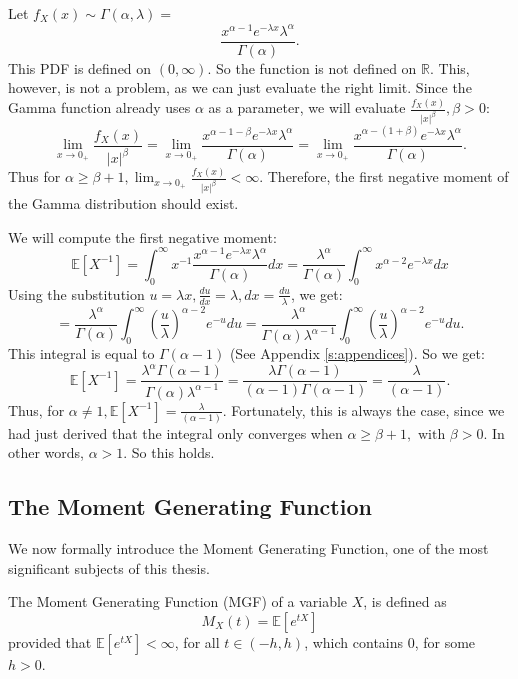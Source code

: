 \begin{example}\label{e: negative}
    Let \(f_X(x) \sim \Gamma(\alpha, \lambda) =\) 
    \[\frac{x^{\alpha -1} e^{-\lambda x} \lambda^\alpha} {\Gamma(\alpha)}.\] This PDF is defined on \((0, \infty)\). So the function is not defined on \(\mathbb{R}\). This, however, is not a problem, as we can just evaluate the right limit. Since the Gamma function already uses \(\alpha\) as a parameter, we will evaluate \(\frac{f_X(x)}{|x|^\beta}, \beta > 0\):
    \[\lim_{x \to 0_+} \frac{f_X(x)}{|x|^\beta} = \lim_{x \to 0_+} \frac{x^{\alpha -1 - \beta} e^{-\lambda x} \lambda^\alpha} {\Gamma(\alpha)} = \lim_{x \to 0_+} \frac{x^{\alpha -(1 + \beta)} e^{-\lambda x} \lambda^\alpha} {\Gamma(\alpha)} .\] Thus for \(\alpha \geq \beta + 1, \lim_{x \to 0_+} \frac{f_X(x)}{|x|^\beta} < \infty\). Therefore, the first negative moment of the Gamma distribution should exist.

    We will compute the first negative moment: 
    \[ \mathbb{E}[X^{-1}] = \int_{0}^{\infty} x^{-1} \frac{x^{\alpha -1} e^{-\lambda x} \lambda^\alpha} {\Gamma(\alpha)} dx = \frac{\lambda^\alpha}{\Gamma(\alpha)} \int_{0}^{\infty} x^{\alpha - 2} e^{-\lambda x} dx\]
    Using the substitution \( u = \lambda x, \frac{du}{dx} = \lambda, dx = \frac{du}{\lambda}\), we get:
    \[ = \frac{\lambda^\alpha}{\Gamma(\alpha)} \int_{0}^{\infty}\left(\frac{u}{\lambda}\right)^{\alpha -2} e^{-u} du = \frac{\lambda^\alpha}{\Gamma(\alpha) \lambda^{\alpha-1}} \int_{0}^{\infty}(\frac{u}{\lambda})^{\alpha -2} e^{-u} du.\] This integral is equal to \(\Gamma(\alpha - 1)\) (See Appendix \ref{s:appendices}). So we get: 
    \[\mathbb{E}[X^{-1}] = \frac{\lambda^\alpha \Gamma(\alpha - 1) }{\Gamma(\alpha) \lambda^{\alpha-1}} = \frac{\lambda \Gamma(\alpha - 1)}{(\alpha -1)\Gamma(\alpha - 1)} = \frac{\lambda}{(\alpha -1)}.\] Thus, for \(\alpha \neq 1, \mathbb{E}[X^{-1}] = \frac{\lambda}{(\alpha -1)}\). Fortunately, this is always the case, since we had just derived that the integral only converges when \(\alpha \geq \beta + 1, \text{ with } \beta > 0\). In other words, \(\alpha > 1\). So this holds.
\end{example}
\subsection{The Moment Generating Function}
We now formally introduce the Moment Generating Function, one of the most significant subjects of this thesis.
\begin{definition}
    The Moment Generating Function (MGF) of a variable \(X\), is defined as
    \[M_X(t) = \mathbb{E}[e^{tX}]\] provided that \(\mathbb{E}[e^{tX}] < \infty\), for all  \( t \in (- h, h)\), which contains 0, for some \(h > 0\).
\end{definition}

